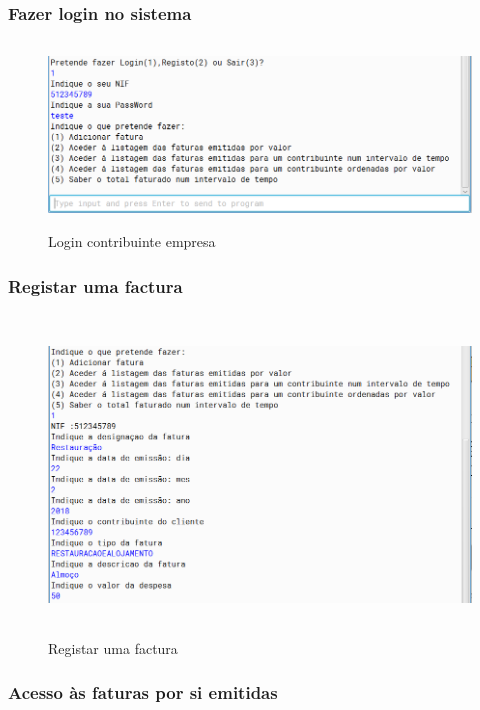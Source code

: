 \documentclass[a4paper]{article}
\begin{document}
		\subsubsection{Fazer login no sistema}
			\begin{figure}[H]
				\centering
				\includegraphics[width = 320pt,height = 140pt]{loginempresa.png}
				\caption{Login contribuinte empresa}
			\end{figure}
		\subsubsection{Registar uma factura}
			\begin{figure}[H]
				\centering
				\includegraphics[width = 320pt,height = 240pt]{adicionarfaturaempresa.png}
				\caption{Registar uma factura}
			\end{figure}
		\subsubsection{Acesso às faturas por si emitidas}
		
\end{document}
